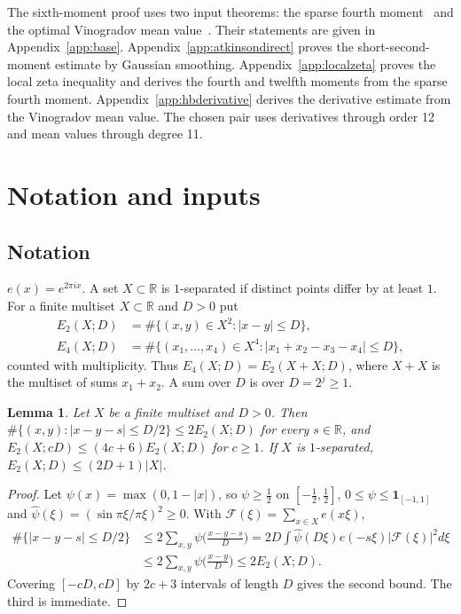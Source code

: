 \documentclass[11pt]{amsart}
\newtheorem{lemma}[theorem]{Lemma}
\theoremstyle{definition}
\theoremstyle{remark}
\numberwithin{equation}{section}
\begin{document}
The sixth-moment proof uses two input theorems: the sparse fourth
moment~\cite{Iwa80} and the optimal Vinogradov mean
value~\cite{BDG16,Woo16}. Their statements are
given in Appendix~\ref{app:base}. Appendix~\ref{app:atkinsondirect}
proves the short-second-moment estimate by Gaussian smoothing.
Appendix~\ref{app:localzeta} proves the local zeta inequality and
derives the fourth and twelfth moments from the sparse fourth moment.
Appendix~\ref{app:hbderivative} derives the derivative estimate from
the Vinogradov mean value. The chosen pair uses derivatives through
order 12 and mean values through degree 11.

\section{Notation and inputs}

\subsection{Notation}
$e(x)=e^{2\pi ix}$. A set $X\subset\mathbb R$ is $1$-separated if distinct points differ by at least $1$. For a finite multiset $X\subset\mathbb R$ and $D>0$ put
\begin{align*}
E_2(X;D)&=\#\{(x,y)\in X^2:|x-y|\le D\},\\
E_4(X;D)&=\#\{(x_1,\dots,x_4)\in X^4:|x_1+x_2-x_3-x_4|\le D\},
\end{align*}
counted with multiplicity. Thus $E_4(X;D)=E_2(X\!+\!X;D)$, where $X\!+\!X$ is the multiset of sums $x_1+x_2$. A sum over $D$ is over $D=2^j\ge1$.

\begin{lemma}\label{lem:enlarge}
Let $X$ be a finite multiset and $D>0$. Then $\#\{(x,y):|x-y-s|\le D/2\}\le 2E_2(X;D)$ for every $s\in\mathbb R$, and $E_2(X;cD)\le(4c+6)E_2(X;D)$ for $c\ge1$. If $X$ is $1$-separated, $E_2(X;D)\le(2D+1)|X|$.
\end{lemma}

\begin{proof}
Let $\psi(x)=\max(0,1-|x|)$, so $\psi\ge\frac12$ on $[-\frac12,\frac12]$, $0\le\psi\le\mathbf 1_{[-1,1]}$ and $\widehat\psi(\xi)=(\sin\pi\xi/\pi\xi)^2\ge0$. With $\mathcal F(\xi)=\sum_{x\in X}e(x\xi)$,
\begin{align*}
\#\{|x-y-s|\le D/2\}&\le2\sum_{x,y}\psi\Big(\frac{x-y-s}{D}\Big)
=2D\int\widehat\psi(D\xi)e(-s\xi)|\mathcal F(\xi)|^2d\xi\\
&\le2\sum_{x,y}\psi\Big(\frac{x-y}{D}\Big)\le2E_2(X;D).
\end{align*}
Covering $[-cD,cD]$ by $2c+3$ intervals of length $D$ gives the second bound. The third is immediate.
\end{proof}
\end{document}
